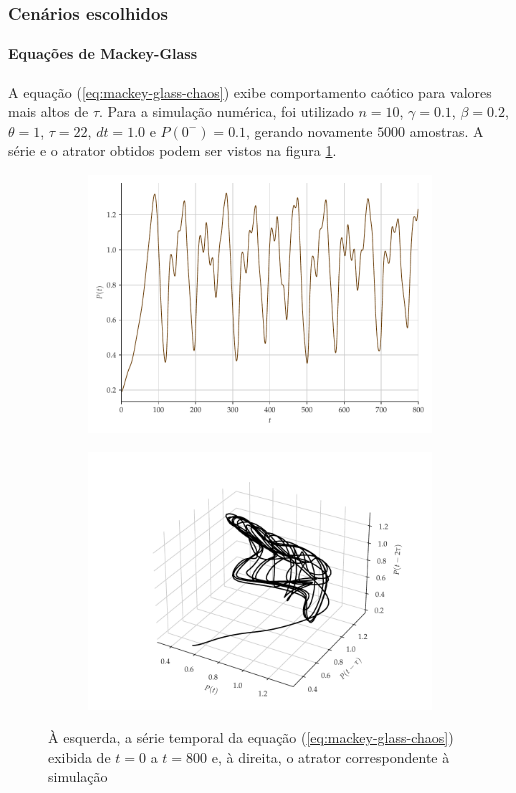 \documentclass[aspectratio=169]{beamer}
\begin{document}
\begin{frame}
	\frametitle{Cenários escolhidos}
	\framesubtitle{Equações de Mackey-Glass}
\justifying A equação (\ref{eq:mackey-glass-chaos}) exibe comportamento caótico para valores mais altos de $\tau$. Para a simulação numérica, foi utilizado $n = 10$, $\gamma = 0.1$, $\beta = 0.2$, $\theta = 1$, $\tau = 22$, $dt = 1.0$ e $P(0^-)=0.1$, gerando novamente $5000$ amostras. A série e o atrator obtidos podem ser vistos na figura \ref{fig:mackey-glass}.
\begin{figure}[H]
     \begin{subfigure}[t]{0.3\textwidth}
         \includegraphics[scale=0.2]{serie-mackeyglass.pdf}
     \end{subfigure}
     \centering
     \begin{subfigure}[t]{0.3\textwidth}
         \includegraphics[scale=0.2]{atrator-mackeyglass.pdf}
     \end{subfigure}
     \caption{À esquerda, a série temporal da equação (\ref{eq:mackey-glass-chaos}) exibida de $t = 0 $ a $t = 800$ e, à direita, o atrator correspondente à simulação}
     \label{fig:mackey-glass}
\end{figure}
\end{frame}
\end{document}
